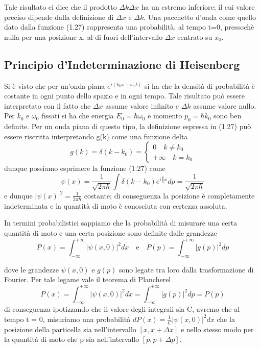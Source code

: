 Tale risultato ci dice che il prodotto $\Delta k \Delta x$ ha un estremo inferiore; il cui valore preciso dipende dalla definizione di $\Delta x$ e $\Delta k$. Una pacchetto d'onda come quello dato dalla funzione (1.27) rappresenta una probabilit\`a, al tempo t=0, pressoch\`e nulla per  una posizione x, al di fuori dell'intervallo $\Delta x $ centrato su $x_0$.


\subsection{Principio d'Indeterminazione di Heisenberg}

Si \`e visto che per un'onda piana $e^{i(k_0x-\omega_0 t)}$ si ha che la densit\`a di probabilit\`a \`e costante in ogni punto dello spazio e in ogni tempo. Tale risultato pu\`o essere interpretato con il fatto che $\Delta x $ assume valore infinito e $\Delta k$ assume valore nullo. Per $k_0$ e $\omega_0$ fissati si ha che energia $E_0 = \hbar \omega_0$ e momento $p_0 = \hbar k_{0}$ sono ben definite. Per un onda piana di questo tipo, la definizione espressa in (1.27) pu\`o essere riscritta interpretando g(k) come una funzione delta
\begin{equation*}
g(k) = \delta(k-k_0) = 
\left \{\begin{array}{l}
	0 \quad k \neq k_0 \\
	+ \infty \quad k = k_0
\end{array} \right.
\end{equation*}
dunque possiamo esprimere la funzione (1.27) come 
\begin{equation*}
	\psi(x) = \frac{1}{\sqrt{2\pi\hbar }}\int \delta(k-k_0)e^{i\frac{p}{\hbar}x}dp = \frac{1}{\sqrt{2\pi \hbar}}
\end{equation*}
e dunque $|\psi(x)|^2 = \frac{1}{2 \pi \hbar}$ costante; di conseguenza la posizione \`e completamente indeterminata e la quantit\`a di moto \`e conosciuta con certezza assoluta.  
\newline

\noindent In termini probabilistici sappiamo che la probabilit\`a di misurare una certa quantit\`a di moto e una certa posizione sono definite dalle grandezze 
\begin{equation*}
	P(x) = \int_{- \infty}^{+\infty} |\psi(x,0)|^2dx \quad \text{e} \quad P(p) = \int_{-\infty}^{+\infty} |g(p)|^2dp
\end{equation*} 

dove le grandezze $\psi(x,0)$ e $g(p)$ sono legate tra loro dalla trasformazione di Fourier. Per tale legame vale il teorema di Plancherel
\begin{equation*}
	P(x) = \int_{- \infty}^{+\infty} |\psi(x,0)|^2dx  = \int_{-\infty}^{+\infty} |g(p)|^2dp
 =P(p)
\end{equation*}
di conseguenza ipotizzando che il valore degli integrali sia C, avremo che al tempo t = 0, misuriamo una probabilit\`a $dP(x) = \frac{1}{C}|\psi(x,0)|^2dx$ che la posizione della particella sia nell'intervallo $[x, x+ \Delta x]$ e nello stesso modo per la quantit\`a di moto che p sia nell'intervallo $[p,p + \Delta p]$.


